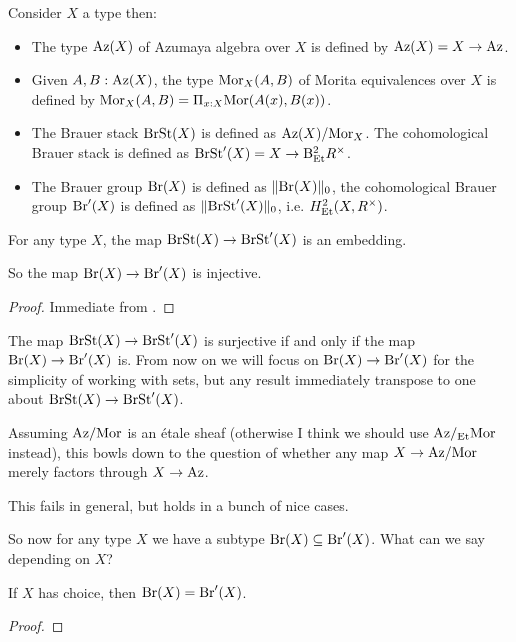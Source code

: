 \begin{definition}
Consider $X$ a type then:
\begin{itemize}
\item The type ${\mathrm{Az}}(X)$ of Azumaya algebra over $X$ is defined by ${\mathrm{Az}}(X) = X\to {\mathrm{Az}}$.
\item Given $A,B:{\mathrm{Az}}(X)$, the type ${\mathrm{Mor}}_X(A,B)$ of Morita equivalences over $X$ is defined by ${\mathrm{Mor}}_X(A,B) = \Pi_{x:X}{\mathrm{Mor}}(A(x),B(x))$.
\item The Brauer stack $\mathrm{BrSt}(X)$ is defined as ${\mathrm{Az}}(X)/{\mathrm{Mor}}_X$. The cohomological Brauer stack is defined as $\mathrm{BrSt}'(X) = X\to \mathrm{B}^2_{{\mathrm{Et}}}R^\times$.
\item The Brauer group $\mathrm{Br}(X)$ is defined as $\lVert \mathrm{Br}(X) \rVert_0$, the cohomological Brauer group $\mathrm{Br}'(X)$ is defined as $\lVert \mathrm{BrSt}'(X) \rVert_0$, i.e. $H^2_{{\mathrm{Et}}}(X,R^\times)$.
\end{itemize}
\end{definition}

\begin{lemma}
For any type $X$, the map $\mathrm{BrSt}(X)\to \mathrm{BrSt}'(X)$ is an embedding.

So the map $\mathrm{Br}(X)\to \mathrm{Br}'(X)$ is injective.
\end{lemma}

\begin{proof}
Immediate from .
\end{proof}

\begin{remark}
The map $\mathrm{BrSt}(X)\to \mathrm{BrSt}'(X)$ is surjective if and only if the map $\mathrm{Br}(X)\to \mathrm{Br}'(X)$ is. From now on we will focus on $\mathrm{Br}(X)\to \mathrm{Br}'(X)$ for the simplicity of working with sets, but any result immediately transpose to one about $\mathrm{BrSt}(X)\to \mathrm{BrSt}'(X)$.

Assuming ${\mathrm{Az}}/{\mathrm{Mor}}$ is an étale sheaf (otherwise I think we should use ${\mathrm{Az}}/_{{\mathrm{Et}}}{\mathrm{Mor}}$ instead), this bowls down to the question of whether any map $X\to {\mathrm{Az}}/{\mathrm{Mor}}$ merely factors through $X\to{\mathrm{Az}}$.

This fails in general, but holds in a bunch of nice cases.
\end{remark}

So now for any type $X$ we have a subtype $\mathrm{Br}(X)\subseteq \mathrm{Br}'(X)$. What can we say depending on $X$?

\begin{lemma}
If $X$ has choice, then $\mathrm{Br}(X)=\mathrm{Br}'(X)$.
\end{lemma}

\begin{proof}
\end{proof}

